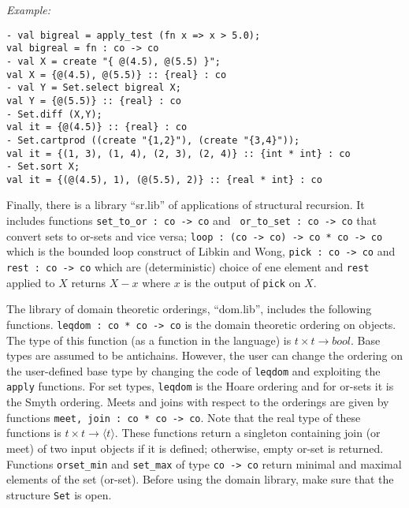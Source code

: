 {\em Example:}

{\small \begin{verbatim}
- val bigreal = apply_test (fn x => x > 5.0);
val bigreal = fn : co -> co
- val X = create "{ @(4.5), @(5.5) }";
val X = {@(4.5), @(5.5)} :: {real} : co
- val Y = Set.select bigreal X;
val Y = {@(5.5)} :: {real} : co
- Set.diff (X,Y);
val it = {@(4.5)} :: {real} : co
- Set.cartprod ((create "{1,2}"), (create "{3,4}"));
val it = {(1, 3), (1, 4), (2, 3), (2, 4)} :: {int * int} : co
- Set.sort X;
val it = {(@(4.5), 1), (@(5.5), 2)} :: {real * int} : co
\end{verbatim} } 


Finally, there is a library ``sr.lib'' of applications of structural
recursion. It includes functions {\tt set\_to\_or : co -> co} and {\tt
or\_to\_set : co -> co} that convert sets to or-sets and vice versa;
{\tt loop : (co -> co) -> co * co -> co} which is the bounded loop
construct of Libkin and Wong, {\tt pick : co
-> co} and {\tt rest : co -> co} which are (deterministic) choice of
ene element and {\tt rest} applied to $X$ returns $X - x$ where $x$ is
the output of {\tt pick} on $X$. 

The library of domain theoretic orderings, ``dom.lib'', includes the
following functions. {\tt leqdom : co * co -> co} is the domain
theoretic ordering on objects. The type of this function (as a
function in the language) is $t \times t \to bool$. Base types are
assumed to be antichains. However, the user can change the ordering on
the user-defined base type by changing the code of {\tt leqdom} and
exploiting the {\tt apply} functions. For set types, {\tt leqdom} is
the Hoare ordering and for or-sets it is the Smyth ordering. 
Meets and joins with respect to the orderings are
given by functions {\tt meet, join : co * co -> co}. Note that the
real type of these functions is $t \times t \to \langle t \rangle$.
These functions return a singleton containing join (or meet) of two
input objects if it is defined; otherwise, empty or-set is returned.
Functions {\tt orset\_min} and {\tt set\_max} of type {\tt co -> co}
return minimal and maximal elements of the set (or-set). Before using
the domain library, make sure that the structure {\tt Set} is open.



